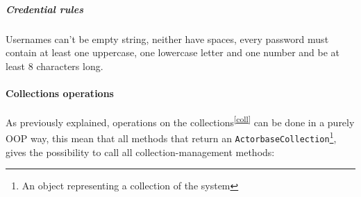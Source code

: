 \documentclass{scalatekids-article}
\begin{document}
\subparagraph{Credential rules}
Usernames can't be empty string, neither have spaces, every password must
contain at least one uppercase, one lowercase letter and one number and be at
least 8 characters long.

\paragraph{Collections operations}

As previously explained, operations on the collections\textsuperscript{\ref{coll}} can be done in a purely
OOP way, this mean that all methods that return an \verb=ActorbaseCollection=\footnote{An object representing a collection of the system\label{ABcoll}},
gives the possibility to call all collection-management methods:
\end{document}
